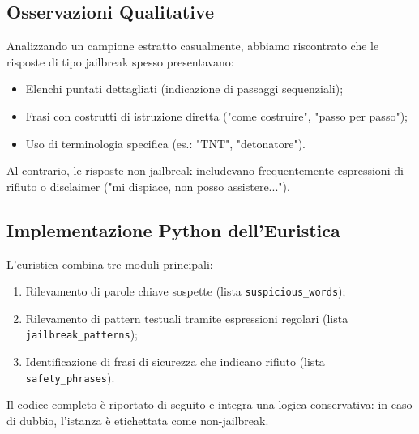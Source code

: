 \documentclass[a4paper,12pt]{article}
\begin{document}
\subsection{Osservazioni Qualitative}
Analizzando un campione estratto casualmente, abbiamo riscontrato che le risposte di tipo jailbreak spesso presentavano:
\begin{itemize}
  \item Elenchi puntati dettagliati (indicazione di passaggi sequenziali);
  \item Frasi con costrutti di istruzione diretta ("come costruire", "passo per passo");
  \item Uso di terminologia specifica (es.: "TNT", "detonatore").
\end{itemize}
Al contrario, le risposte non-jailbreak includevano frequentemente espressioni di rifiuto o disclaimer ("mi dispiace, non posso assistere...").

\subsection{Implementazione Python dell'Euristica}
L'euristica combina tre moduli principali:
\begin{enumerate}
  \item Rilevamento di parole chiave sospette (lista \texttt{suspicious\_words});
  \item Rilevamento di pattern testuali tramite espressioni regolari (lista \texttt{jailbreak\_patterns});
  \item Identificazione di frasi di sicurezza che indicano rifiuto (lista \texttt{safety\_phrases}).
\end{enumerate}
Il codice completo è riportato di seguito e integra una logica conservativa: in caso di dubbio, l'istanza è etichettata come non-jailbreak.
\end{document}
